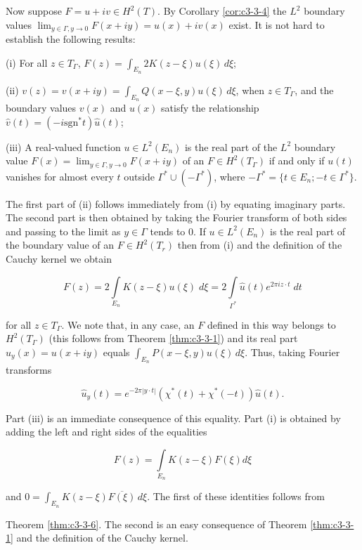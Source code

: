 Now suppose $F = u + iv \in H^2(T)$. By Corollary \ref{cor:c3-3-4} the $L^2$ boundary values $\lim_{y \in \Gamma, y \to 0} F(x + iy) = u(x) + iv(x)$ exist. It is not hard to establish the following results:

(i) For all $z \in T_{\Gamma}$, $F(z) = \int_{E_n} 2K(z - \xi) u(\xi) \, d\xi$;

(ii) $v(z) = v(x + iy) = \int_{E_n} Q(x - \xi, y)u(\xi) \, d\xi$, when $z \in T_\Gamma$, and the boundary values $v(x)$ and $u(x)$ satisfy the relationship $\hat{v}(t) = (-i \text{sgn}^* t)\hat{u}(t)$;

(iii) A real-valued function $u \in L^2(E_n)$ is the real part of the $L^2$ boundary value $F(x) = \lim_{y \in \Gamma, y \to 0} F(x + iy)$ of an $F \in H^2(T_\Gamma)$ if and only if $u(t)$ vanishes for almost every $t$ outside $\Gamma^* \cup (-\Gamma^*)$, where $-\Gamma^* = \{t \in E_n; -t \in \Gamma^*\}$.

The first part of (ii) follows immediately from (i) by equating imaginary parts. The second part is then obtained by taking the Fourier transform of both sides and passing to the limit as $y \in \Gamma$ tends to 0. If $u \in L^2(E_n)$ is the real part of the boundary value of an $F \in H^2(T_r)$ then from (i) and the definition of the Cauchy kernel we obtain

\[
F(z)=2\int\limits_{E_{n}}K(z-\xi)u(\xi)\;d\xi=2\int\limits_{\Gamma^{*}}\hat{u}(t)e^{2\pi i z\cdot t}\;d t
\]

for all $z \in T_{\Gamma}$. We note that, in any case, an $F$ defined in this way belongs to $H^2(T_{\Gamma})$ (this follows from Theorem \ref{thm:c3-3-1}) and its real part $u_y(x) = u(x + iy)$ equals $\int_{E_n} P(x - \xi, y)u(\xi) \, d\xi$. Thus, taking Fourier transforms

\[
\hat{u}_{y}(t)=e^{-2\pi|y\cdot t|}(\chi^{*}(t)+\chi^{*}(-t))\hat{u}(t).
\]

Part (iii) is an immediate consequence of this equality. Part (i) is obtained by adding the left and right sides of the equalities

\[
F(z)=\int\limits_{E_{n}}K(z-\xi)F(\xi)d\xi
\]

and $0 = \int_{E_n} K(z - \xi) \overline{F(\xi)} \, d\xi$. The first of these identities follows from

Theorem \ref{thm:c3-3-6}. The second is an easy consequence of Theorem \ref{thm:c3-3-1} and the definition of the Cauchy kernel.

